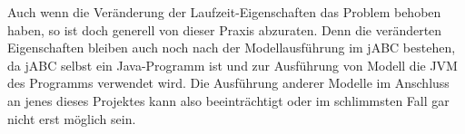 \begin{lstlisting}[float=h!t]

\end{lstlisting}


Auch wenn die Veränderung der Laufzeit-Eigenschaften das Problem behoben haben, so ist doch generell von dieser Praxis abzuraten.
Denn die veränderten Eigenschaften bleiben auch noch nach der Modellausführung im jABC bestehen, da jABC selbst ein Java-Programm
 ist und zur Ausführung von Modell die JVM des Programms verwendet wird.
Die Ausführung anderer Modelle im Anschluss an jenes dieses Projektes kann also beeinträchtigt oder im schlimmsten Fall gar
 nicht erst möglich sein.
\FloatBarrier